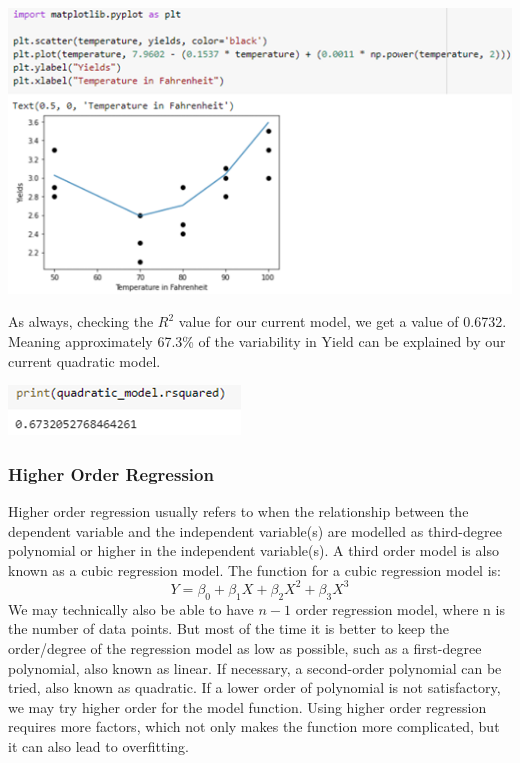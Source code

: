 \documentclass[a4paper,12pt]{report}
\begin{document}
\begin{center}
    \captionsetup{type=figure}
    \includegraphics[width=.9\linewidth]{media/tempyieldsplot.png}
\end{center}

As always, checking the $R^2$ value for our current model, we get a value of 0.6732. Meaning approximately 67.3\% of the variability in Yield can be explained by our current quadratic model. 

\begin{center}
    \captionsetup{type=figure}
    \includegraphics[width=.9\linewidth]{media/tempquadratic.png}
\end{center}

\subsubsection{Higher Order Regression}
Higher order regression usually refers to when the relationship between the dependent variable and the independent variable(s) are modelled as third-degree polynomial or higher in the independent variable(s). A third order model is also known as a cubic regression model. The function for a cubic regression model is:
$$Y=\beta_0+\beta_1X+\beta_2X^2+\beta_3X^3$$
We may technically also be able to have $n - 1$ order regression model, where n is the number of data points. But most of the time it is better to keep the order/degree of the regression model as low as possible, such as a first-degree polynomial, also known as linear. If necessary, a second-order polynomial can be tried, also known as quadratic. If a lower order of polynomial is not satisfactory, we may try higher order for the model function. Using higher order regression requires more factors, which not only makes the function more complicated, but it can also lead to overfitting.
\end{document}
